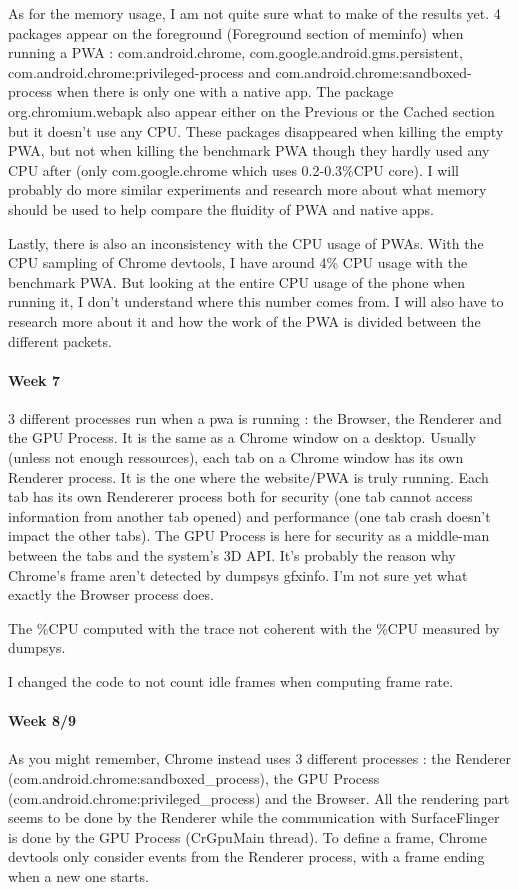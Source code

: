 \documentclass{kththesis}
\begin{document}
As for the memory usage, I am not quite sure what to make of the results yet.
4 packages appear on the foreground (Foreground section of meminfo) when running a PWA : com.android.chrome, com.google.android.gms.persistent,  com.android.chrome:privileged-process and com.android.chrome:sandboxed-process when there is only one with a native app. The package org.chromium.webapk also appear either on the Previous or the Cached section but it doesn't use any CPU.
These packages disappeared when killing the empty PWA, but not when killing the benchmark PWA though they hardly used any CPU after (only com.google.chrome which uses 0.2-0.3\%CPU core). 
I will probably do more similar experiments and research more about what memory should be used to help compare the fluidity of PWA and native apps.

Lastly, there is also an inconsistency with the CPU usage of PWAs. With the CPU sampling of Chrome devtools, I have around 4\% CPU usage with the benchmark PWA. But looking at the entire CPU usage of the phone when running it, I don't understand where this number comes from. I will also have to research more about it and how the work of the PWA is divided between the different packets.

\paragraph{Week 7}
3 different processes run when a pwa is running : the Browser, the Renderer and the GPU Process. It is the same as a Chrome window on a desktop. Usually (unless not enough ressources), each tab on a Chrome window has its own Renderer process. It is the one where the website/PWA is truly running. Each tab has its own Rendererer process both for security (one tab cannot access information from another tab opened) and performance (one tab crash doesn't impact the other tabs). The GPU Process is here for security as a middle-man between the tabs and the system's 3D API. It's probably the reason why Chrome's frame aren't detected by dumpsys gfxinfo. I'm not sure yet what exactly the Browser process does.

The \%CPU computed with the trace not coherent with the \%CPU measured by dumpsys.

I changed the code to not count idle frames when computing frame rate. 
\newline

\paragraph{Week 8/9}
As you might remember, Chrome instead uses 3 different processes : the Renderer (com.android.chrome:sandboxed\_process), the GPU Process (com.android.chrome:privileged\_process) and the Browser. All the rendering part seems to be done by the Renderer while the communication with SurfaceFlinger is done by the GPU Process (CrGpuMain thread). To define a frame, Chrome devtools only consider events from the Renderer process, with a frame ending when a new one starts.
\end{document}
